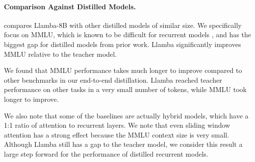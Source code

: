 \paragraph{Comparison Against Distilled Models.}
 compares Llamba-8B with other distilled models of similar size.
We specifically focus on MMLU, which is known to be difficult for recurrent models \citep{waleffe2024}, and has the biggest gap for distilled models from prior work. Llamba significantly improves MMLU relative to the teacher model.

We found that MMLU performance takes much longer to improve compared to other benchmarks in our end-to-end distillation. Llamba reached teacher performance on other tasks in a very small number of tokens, while MMLU took longer to improve. 

We also note that some of the baselines are actually hybrid models, which have a 1:1 ratio of attention to recurrent layers. We note that even sliding window attention has a strong effect because the MMLU context size is very small. 
Although Llamba still has a gap to the teacher model, we consider this result a large step forward for the performance of distilled recurrent models.



